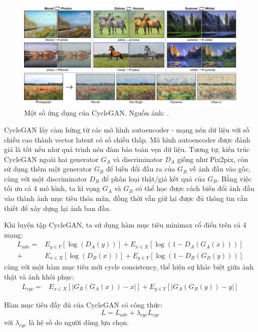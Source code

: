 \documentclass[12pt]{extreport}
\begin{document}
\begin{figure}[H]
    \centering
    \includegraphics[width=\textwidth]{figure15}
    \caption{Một số ứng dụng của CycleGAN. Nguồn ảnh: \cite{CycleGAN2017}.}
\end{figure}

CycleGAN lấy cảm hứng từ các mô hình autoencoder - mạng nén dữ liệu với số chiều cao thành vector latent có số chiều thấp. Mô hình autoencoder được đánh giá là tốt nếu như quá trình nén đảm bảo toàn vẹn dữ liệu. Tương tự, kiến trúc CycleGAN ngoài hai generator $ G_A $ và discriminator $ D_A $ giống như Pix2pix, còn sử dụng thêm một generator $ G_B $ để biến đổi đầu ra của $ G_B $ về ảnh đầu vào gốc, cùng với một discriminator $ D_B $ để phân loại thật/giả kết quả của $ G_B $. Bằng việc tối ưu cả 4 mô hình, ta kì vọng $ G_A $ và $ G_B $ có thể học được cách biến đổi ảnh đầu vào thành ảnh mục tiêu thỏa mãn, đồng thời vẫn giữ lại được đủ thông tin cần thiết để xây dựng lại ảnh ban đầu.

Khi luyện tập CycleGAN, ta sử dụng hàm mục tiêu minimax cổ điển trên cả 4 mạng:
\begin{align*}
    L_{adv} = & E_{y \in Y} [\log(D_A(y))] + E_{x \in X} [\log(1 - D_A(G_A(x)))] \\
    +         & E_{x \in X} [\log(D_B(x))] + E_{y \in Y} [\log(1 - D_B(G_B(y)))]
\end{align*}
cùng với một hàm mục tiêu mới cycle consistency, thể hiện sự khác biệt giữa ảnh thật và ảnh khôi phục:
\begin{align*}
    L_{cyc} = & E_{x \in X} [|G_B(G_A(x)) - x|] + E_{y \in Y} [|G_A(G_B(y)) - y|]
\end{align*}

Hàm mục tiêu đầy đủ của CycleGAN có công thức:
$$ L = L_{adv} + \lambda_{cyc} L_{cyc} $$
với $ \lambda_{cyc} $ là hệ số do người dùng lựa chọn.
\end{document}
